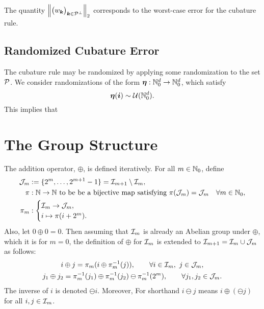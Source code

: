\documentclass[12pt]{amsart}
\begin{document}
The quantity $\norm[2]{\bigl(w_{\vk} \bigr)_{\vk \in \cp^\perp} }$ corresponds to the worst-case error for the cubature rule.

\subsection{Randomized Cubature Error}
The cubature rule may be randomized by applying some randomization to the set $\cp$.  We consider randomizations of the form $\veta : \natzero^d \to \natzero^d$, which satisfy 
\begin{equation}
    \veta(\vi) \sim \cu(\natzero^d).
\end{equation}
This implies that 



\section{The Group Structure} \label{sec:Group}
The addition operator, $\oplus$, is defined iteratively. For all $m \in \natzero$, define 
\begin{align*}
    \cj_m & := \{2^m, \dots, 2^{m+1}-1 \} = \ci_{m+1} \setminus \ci_m, \\
    \pi & : \naturals \to \naturals \text{ to be be a bijective map satisfying } \pi(\cj_m) = \cj_m \quad \forall m \in \natzero, \\
    \pi_m & : \begin{cases} 
    \ci_m \to \cj_m, \\
    i \mapsto \pi(i+2^m).
    \end{cases}
\end{align*}
Also, let $0 \oplus 0 = 0$.  Then assuming that $\ci_m$ is already an Abelian group under $\oplus$, which it is for $m=0$, the definition of $\oplus$ for $\ci_m$ is extended to $\ci_{m+1} = \ci_m \cup \cj_m$ as follows:
\begin{subequations} \label{oplusDef}
\begin{gather}
    \label{oplusDefA}
    i \oplus j = \pi_m( i \oplus \pi_m^{-1}(j)), \qquad \forall i \in \ci_m,\ j \in \cj_m, \\
    \label{oplusDefB}
    j_1 \oplus j_2 = \pi_m^{-1}( j_1) \oplus \pi_m^{-1}(j_2) \ominus \pi_m^{-1}(2^m), \qquad \forall j_1, j_2 \in \cj_m.
\end{gather}
\end{subequations}
The inverse of $i$ is denoted $\ominus i$.  Moreover, For shorthand $i \ominus j$ means $i \oplus (\ominus j)$ for all $i, j \in \ci_m$.
\end{document}
